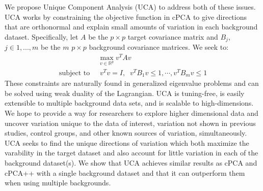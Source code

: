 \documentclass[12pt]{article}
\begin{document}
    
    
    We propose Unique Component Analysis (UCA) to address both of these issues. UCA works by constraining the objective function in cPCA to give directions that are orthonormal and explain small amounts of variation in each background dataset. Specifically, let $A$ be the $p \times p$ target covariance matrix and $B_j$, $j \in 1,...,m$ be the $m$ $p\times p$ background covariance matrices. We seek to: 
     \begin{align}
         &\max_{v\in \mathbb{R}^p}{v^TAv} \nonumber\\ 
         \text{subject to }&\; v^{T}v=I,\;\; v^TB_1 v \leq 1, \cdots, v^T B_m v \leq 1 \nonumber
     \end{align}
    These constraints are naturally found in generalized eigenvalue problems and can be solved using weak duality of the Lagrangian.
    UCA is tuning-free, is easily extensible to multiple background data sets, and is scalable to high-dimensions. We hope to provide a way for researchers to explore higher dimensional data and uncover variation unique to the data of interest, variation not shown in previous studies, control groups, and other known sources of variation, simultaneously. UCA seeks to find the unique directions of variation which both maximize the varability in the target dataset and also account for little variation in each of the background dataset(s). We show that UCA achieves similar results as cPCA and cPCA++ with a single background dataset and that it can outperform them when using multiple backgrounds. %
\end{document}

